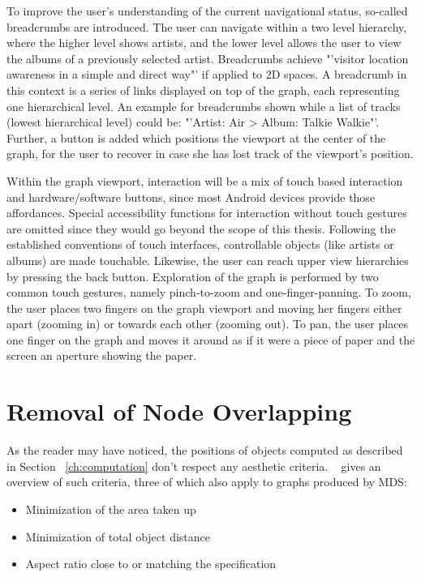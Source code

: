 To improve the user's understanding of the current navigational status, so-called breadcrumbs are introduced. The user can navigate within a two level hierarchy, where the higher level shows artists, and the lower level allows the user to view the albums of a previously selected artist. Breadcrumbs achieve "'visitor location awareness in a simple and direct way"' \cite{Tesoriero:2008:Breadcrumbs} if applied to 2D spaces. A breadcrumb in this context is a series of links displayed on top of the graph, each representing one hierarchical level. An example for breadcrumbs shown while a list of tracks (lowest hierarchical level) could be: "'Artist: Air > Album: Talkie Walkie"'. Further, a button is added which positions the viewport at the center of the graph, for the user to recover in case she has lost track of the viewport's position.

Within the graph viewport, interaction will be a mix of touch based interaction and hardware/software buttons, since most Android devices provide those affordances. Special accessibility functions for interaction without touch gestures are omitted since they would go beyond the scope of this thesis.
Following the established conventions of touch interfaces, controllable objects (like artists or albums) are made touchable. Likewise, the user can reach upper view hierarchies by pressing the back button.
Exploration of the graph is performed by two common touch gestures, namely pinch-to-zoom and one-finger-panning. To zoom, the user places two fingers on the graph viewport and moving her fingers either apart (zooming in) or towards each other (zooming out). To pan, the user places one finger on the graph and moves it around as if it were a piece of paper and the screen an aperture showing the paper.

\section{Removal of Node Overlapping}
\label{sec:removal-node-overlapping}

As the reader may have noticed, the positions of objects computed as described in Section ~\ref{ch:computation} don't respect any aesthetic criteria. ~\cite{Li:2005} gives an overview of such criteria, three of which also apply to graphs produced by MDS:

\begin{itemize}
	\item Minimization of the area taken up
	\item Minimization of total object distance
	\item Aspect ratio close to or matching the specification
\end{itemize}

